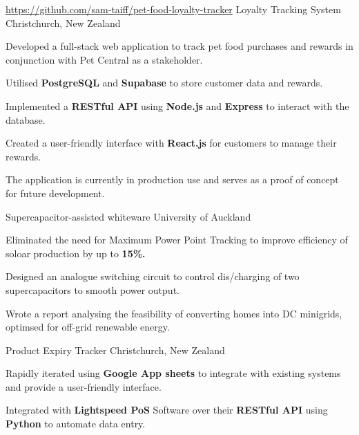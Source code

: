 
\begin{cventries}
  \cventry
    {\href{https://github.com/sam-taiff/pet-food-loyalty-tracker}{\faLink \space https://github.com/sam-taiff/pet-food-loyalty-tracker}}
    {Loyalty Tracking System}
    {Christchurch, New Zealand} %
    {} %
    {
      \begin{cvitems}
        \item {Developed a full-stack web application to track pet food purchases and rewards in conjunction with Pet Central as a stakeholder.}
        \item {Utilised \textbf{PostgreSQL} and \textbf{Supabase} to store customer data and rewards.}
        \item {Implemented a \textbf{RESTful API} using \textbf{Node.js} and \textbf{Express} to interact with the database.}
        \item {Created a user-friendly interface with \textbf{React.js} for customers to manage their rewards.}
        \item {The application is currently in production use and serves as a proof of concept for future development.}
      \end{cvitems}
    }

  \cventry
    {} %
    {Supercapacitor-assisted whiteware} %
    {University of Auckland} %
    {} %
    {
      \begin{cvitems}
        \item {Eliminated the need for Maximum Power Point Tracking to improve efficiency of soloar production by up to \textbf{15\%.}}
        \item {Designed an analogue switching circuit to control dis/charging of two supercapacitors to smooth power output.}
        \item {Wrote a report analysing the feasibility of converting homes into DC minigrids, optimsed for off-grid renewable energy.}
      \end{cvitems}
    }

  \cventry
    {} %
    {Product Expiry Tracker} %
    {Christchurch, New Zealand}
    {} %
    {
      \begin{cvitems}
        \item {Rapidly iterated using \textbf{Google App sheets} to integrate with existing systems and provide a user-friendly interface.}
        \item {Integrated with \textbf{Lightspeed PoS} Software over their \textbf{RESTful API} using \textbf{Python} to automate data entry.}
      \end{cvitems}
    }
\end{cventries}

